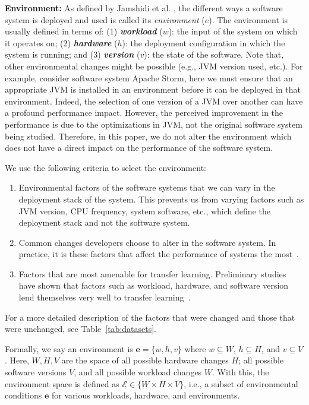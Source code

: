 \documentclass[10pt,journal,compsoc]{IEEEtran}
\newcommand{\be}{\begin{enumerate}}
\newcommand{\ee}{\end{enumerate}}
\begin{document}
\noindent\textbf{Environment: }
As defined by Jamshidi et al. \cite{jamshidi2017transfer2}, 
the different ways
a software system
is deployed and used is called its
  {\em environment} ($e$). 
The environment is usually defined in terms of: (1) \textbf{\textit{workload}} ($w$): the input of the system 
on which it operates on; (2) \textbf{\textit{hardware}} ($h$): the deployment configuration in 
which the system is running; and (3) \textbf{\textit{version}} ($v$): the state of the 
software. 
Note that, other environmental changes might be possible (e.g., JVM version used, etc.). For example, consider software system Apache Storm, here
we must ensure that an appropriate JVM is installed in an environment before it can be deployed in that environment. Indeed, the selection of one version of 
a JVM over another can have a profound performance impact. However, the perceived improvement in the performance is due to the optimizations in JVM, not the original software system being studied.  Therefore, in this paper, we do not alter the environment which does not have a direct impact on the performance of the software system. 

\noindent We use the following criteria to select the  environment:
\be[leftmargin=*]
    \item Environmental factors of the software systems that we can vary in the deployment stack of the system. This prevents us from varying factors such as JVM version, CPU frequency, system software, etc., which define the deployment stack and not the software system. 
    \item Common changes developers choose to alter in the software system. In practice, it is these factors that affect the performance of systems the most~\cite{jamshidi2017transfer2, jamshidi2017transfer, valov2017transferring, valov2015}. 
    \item Factors that are most amenable for transfer learning. Preliminary studies have shown that factors such as workload, hardware, and software version lend themselves very well to transfer learning~\cite{jamshidi2017transfer2, jamshidi2017transfer}.
\ee
For a more detailed description of the factors that were changed and those that were unchanged, see Table~\ref{tab:datasets}.

Formally, we say an environment is   $\mathit{\mathbf{e}}=\{w, h, v\}$ where $w \subseteq W$, $h \subseteq H$, and $v \subseteq V$. Here, $W, H, V$ are the space of all possible hardware changes $H$;   all possible software versions $V$, and all possible workload changes  $W$. With this, the environment space is defined as $\mathcal{E}\in\{W\times H\times V\}$, i.e., a subset of environmental conditions $\mathit{\mathbf{e}}$ for various workloads, hardware, and environments.
\end{document}
